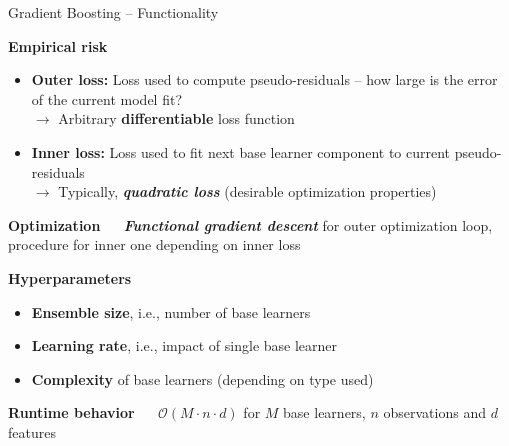 \documentclass[11pt,compress,t,notes=noshow, xcolor=table]{beamer}
\newcommand{\bfit}[1]{\textbf{\textit{#1}}}
\newcommand{\highlight}[1]{\textcolor{highlightcol}{\textbf{#1}}}
\begin{document}

\begin{frame}{Gradient Boosting -- Functionality}

\footnotesize

\highlight{Empirical risk}

\begin{itemize}
  \item \textbf{Outer loss:} Loss used to compute pseudo-residuals -- how large 
  is the error of the current model fit? \\
  $\rightarrow$ Arbitrary \textbf{differentiable} loss function
  \item \textbf{Inner loss:} Loss used to fit next base learner component to 
  current pseudo-residuals \\
  $\rightarrow$ Typically, \bfit{quadratic loss} (desirable 
  optimization properties)
\end{itemize}

\medskip

\highlight{Optimization} ~~ \bfit{Functional gradient descent} for outer 
optimization loop, procedure for inner one depending on inner loss

\medskip

\highlight{Hyperparameters}

\begin{itemize}
  \item \textbf{Ensemble size}, i.e., number of base learners
  \item \textbf{Learning rate}, i.e., impact of single base learner
  \item \textbf{Complexity} of base learners (depending on type used)
\end{itemize}

\medskip

\highlight{Runtime behavior} ~~ $\mathcal{O}(M \cdot n \cdot d)$ 
for $M$ base learners, $n$ observations and $d$ features

\end{frame}

\end{document}
